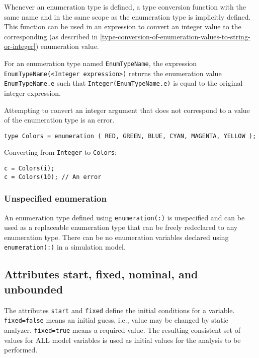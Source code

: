 Whenever an enumeration type is defined, a type conversion function with
the same name and in the same scope as the enumeration type is
implicitly defined. This function can be used in an expression to
convert an integer value to the corresponding (as described in \autoref{type-conversion-of-enumeration-values-to-string-or-integer}) enumeration value.

For an enumeration type named \lstinline!EnumTypeName!, the expression
\lstinline!EnumTypeName(<Integer expression>)! returns the
enumeration value \lstinline!EnumTypeName.e! such that \lstinline!Integer(EnumTypeName.e)! is
equal to the original integer expression.

Attempting to convert an integer argument that does not correspond to a
value of the enumeration type is an error.

\begin{example}
\begin{lstlisting}[language=modelica]
type Colors = enumeration ( RED, GREEN, BLUE, CYAN, MAGENTA, YELLOW );
\end{lstlisting}

Converting from \lstinline!Integer! to \lstinline!Colors!:
\begin{lstlisting}[language=modelica]
c = Colors(i);
c = Colors(10); // An error
\end{lstlisting}
\end{example}

\subsubsection{Unspecified enumeration}

An enumeration type defined using \lstinline!enumeration(:)! is unspecified and can
be used as a replaceable enumeration type that can be freely redeclared
to any enumeration type. There can be no enumeration variables declared
using \lstinline!enumeration(:)! in a simulation model.



\subsection{Attributes start, fixed, nominal, and unbounded}

The attributes \lstinline!start! and \lstinline!fixed! define the initial conditions for a
variable. \lstinline!fixed=false! means an initial guess, i.e., value may be
changed by static analyzer. \lstinline!fixed=true! means a required value. The
resulting consistent set of values for ALL model variables is used as
initial values for the analysis to be performed.

